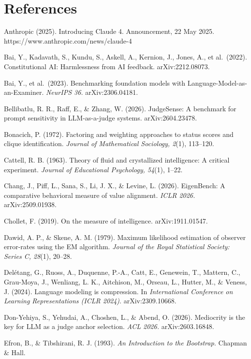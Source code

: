\documentclass{article}
\begin{document}
\section*{References}
\begingroup\small\setlength{\parindent}{-1.5em}\setlength{\leftskip}{1.5em}

Anthropic (2025). Introducing Claude 4. Announcement, 22 May 2025. https://www.anthropic.com/news/claude-4

Bai, Y., Kadavath, S., Kundu, S., Askell, A., Kernion, J., Jones, A., et al.~(2022). Constitutional AI: Harmlessness from AI feedback. arXiv:2212.08073.

Bai, Y., et al.~(2023). Benchmarking foundation models with Language-Model-as-an-Examiner. \emph{NeurIPS 36.} arXiv:2306.04181.

Bellibatlu, R. R., Raff, E., \& Zhang, W. (2026). JudgeSense: A benchmark for prompt sensitivity in LLM-as-a-judge systems. arXiv:2604.23478.

Bonacich, P. (1972). Factoring and weighting approaches to status scores and clique identification. \emph{Journal of Mathematical Sociology, 2}(1), 113--120.

Cattell, R. B. (1963). Theory of fluid and crystallized intelligence: A critical experiment. \emph{Journal of Educational Psychology, 54}(1), 1--22.

Chang, J., Piff, L., Sana, S., Li, J. X., \& Levine, L. (2026). EigenBench: A comparative behavioral measure of value alignment. \emph{ICLR 2026.} arXiv:2509.01938.

Chollet, F. (2019). On the measure of intelligence. arXiv:1911.01547.

Dawid, A. P., \& Skene, A. M. (1979). Maximum likelihood estimation of observer error-rates using the EM algorithm. \emph{Journal of the Royal Statistical Society: Series C, 28}(1), 20--28.

Del\'{e}tang, G., Ruoss, A., Duquenne, P.-A., Catt, E., Genewein, T., Mattern, C., Grau-Moya, J., Wenliang, L. K., Aitchison, M., Orseau, L., Hutter, M., \& Veness, J. (2024). Language modeling is compression. In \emph{International Conference on Learning Representations (ICLR 2024)}. arXiv:2309.10668.

Don-Yehiya, S., Yehudai, A., Choshen, L., \& Abend, O. (2026). Mediocrity is the key for LLM as a judge anchor selection. \emph{ACL 2026.} arXiv:2603.16848.

Efron, B., \& Tibshirani, R. J. (1993). \emph{An Introduction to the Bootstrap.} Chapman \& Hall.
\end{document}
